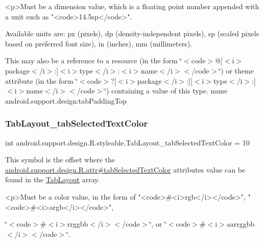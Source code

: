 \begin{DoxyVerb}      <p>Must be a dimension value, which is a floating point number appended with a unit such as "<code>14.5sp</code>".
\end{DoxyVerb}
 Available units are\+: px (pixels), dp (density-\/independent pixels), sp (scaled pixels based on preferred font size), in (inches), mm (millimeters). 

This may also be a reference to a resource (in the form \char`\"{}$<$code$>$@\mbox{[}$<$i$>$package$<$/i$>$\+:\mbox{]}$<$i$>$type$<$/i$>$\+:$<$i$>$name$<$/i$>$$<$/code$>$\char`\"{}) or theme attribute (in the form \char`\"{}$<$code$>$?\mbox{[}$<$i$>$package$<$/i$>$\+:\mbox{]}\mbox{[}$<$i$>$type$<$/i$>$\+:\mbox{]}$<$i$>$name$<$/i$>$$<$/code$>$\char`\"{}) containing a value of this type.  name android.\+support.\+design\+:tab\+Padding\+Top \mbox{\label{classandroid_1_1support_1_1design_1_1R_1_1styleable_a7cb7d0e87c86773cc262cd3f36706eef}} 
\subsubsection{\texorpdfstring{Tab\+Layout\+\_\+tab\+Selected\+Text\+Color}{TabLayout\_tabSelectedTextColor}}
{\footnotesize\ttfamily int android.\+support.\+design.\+R.\+styleable.\+Tab\+Layout\+\_\+tab\+Selected\+Text\+Color = 10\hspace{0.3cm}{\ttfamily [static]}}

This symbol is the offset where the \hyperlink{classandroid_1_1support_1_1design_1_1R_1_1attr_aabda887914ba6ed007645ca2c65c3d90}{android.\+support.\+design.\+R.\+attr\#tab\+Selected\+Text\+Color} attribute\textquotesingle{}s value can be found in the \hyperlink{classandroid_1_1support_1_1design_1_1R_1_1styleable_a514b47b47f600f9421b65f4f0aa832d6}{Tab\+Layout} array.

\begin{DoxyVerb}      <p>Must be a color value, in the form of "<code>#<i>rgb</i></code>", "<code>#<i>argb</i></code>",
\end{DoxyVerb}
 \char`\"{}$<$code$>$\#$<$i$>$rrggbb$<$/i$>$$<$/code$>$\char`\"{}, or \char`\"{}$<$code$>$\#$<$i$>$aarrggbb$<$/i$>$$<$/code$>$\char`\"{}. 

